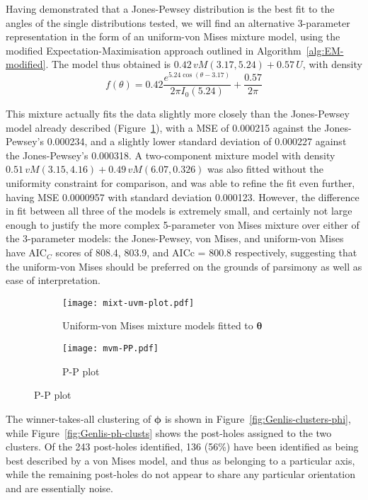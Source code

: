 \documentclass[../../ArchStats.tex]{subfiles}
\begin{document}
Having demonstrated that a Jones-Pewsey distribution is the best fit to the angles of the single distributions tested, we will find an alternative 3-parameter representation in the form of an uniform-von Mises mixture model, using the modified Expectation-Maximisation approach  outlined in Algorithm~\ref{alg:EM-modified}. The model thus obtained is $0.42\,vM(3.17, 5.24) + 0.57\,U$, with density 
\begin{equation}
f(\theta) = 0.42 \frac{e^{5.24 \cos(\theta - 3.17)}}{2\pi I_0(5.24)} + \frac{0.57}{2\pi}
\end{equation}

This mixture actually fits the data slightly more closely than the Jones-Pewsey model already described (Figure~\ref{fig:Genlis-clusters-uvm}), with a MSE of 0.000215 against the Jones-Pewsey's 0.000234, and a slightly lower standard deviation of 0.000227 against the Jones-Pewsey's 0.000318. A two-component mixture model with density $0.51\,vM(3.15, 4.16) + 0.49\, vM(6.07, 0.326)$ was also fitted without the uniformity constraint for comparison, and was able to refine the fit even further, having MSE 0.0000957 with standard deviation 0.000123. However, the difference in fit between all three of the models is extremely small, and certainly not large enough to justify the more complex 5-parameter von Mises mixture over either of the 3-parameter models: the Jones-Pewsey, von Mises, and uniform-von Mises have AIC$_C$ scores of 808.4, 803.9, and AICc = 800.8 respectively, suggesting that the uniform-von Mises should be preferred on the grounds of parsimony as well as ease of interpretation.

\begin{figure}[h!]
\centering
\caption{$\boldsymbol{\theta}$ with fitted uniform-von Mises mixture and Jones-Pewsey models}
\label{fig:Genlis-clusters}
%
\begin{subfigure}[t]{0.4\textwidth}
\centering
\caption{Uniform-von Mises mixture models fitted to $\boldsymbol{\theta}$}
\label{fig:Genlis-clusters-uvm}
\texttt{[image: mixt-uvm-plot.pdf]}
\end{subfigure}
%
\begin{subfigure}[t]{0.4\textwidth}
\caption{P-P plot}
\label{fig:Genlis-clusters-PP}
\texttt{[image: mvm-PP.pdf]}
\end{subfigure}
%
\end{figure}

The winner-takes-all clustering of $\boldsymbol{\phi}$ is shown in Figure~\ref{fig:Genlis-clusters-phi}, while Figure~\ref{fig:Genlis-ph-clusts} shows the post-holes assigned to the two clusters. Of the 243 post-holes identified, 136 (56\%) have been identified as being best described by a von Mises model, and thus as belonging to a particular axis, while the remaining post-holes do not appear to share any particular orientation and are essentially noise.
\end{document}

